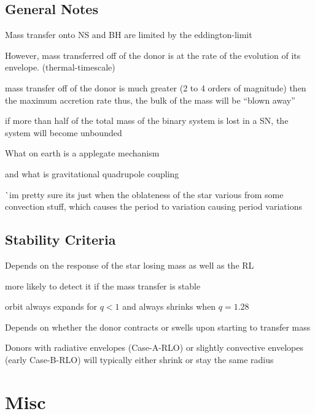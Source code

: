 \documentclass{article}
\begin{document}
\subsection{General Notes}
\begin{list}{-}{}
\item Mass transfer onto NS and BH are limited by the \gls{eddington-limit}
\item However, mass transferred off of the donor is at the rate of the evolution of its envelope. (\gls{thermal-timescale})
\item mass transfer off of the donor is much greater (2 to 4 orders of magnitude) then the maximum accretion rate thus, the bulk of the mass will be ``blown away''
\item if more than half of the total mass of the binary system is lost in a SN, the system will become unbounded 
\item What on earth is a applegate mechanism
\item and what is gravitational quadrupole coupling
\item ^^ im pretty sure its just when the oblateness of the star various from some convection stuff, which causes the period to variation causing period variations 
\end{list}

\subsection{Stability Criteria}
\begin{list}{-}{}
\item Depends on the response of the star losing mass as well as the RL
\item more likely to detect it if the mass transfer is stable 
\item orbit always expands for \(q < 1 \) and always shrinks when \(q = 1.28\)
\item Depends on whether the donor contracts or swells upon starting to transfer mass
\item Donors with radiative envelopes (\gls{Case-A-RLO}) or slightly convective envelopes (early \gls{Case-B-RLO}) will typically either shrink or stay the same radius
\item 
\end{list}




\pagebreak
\setcounter{section}{-1}
\section{Misc}
\end{document}
